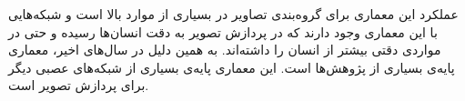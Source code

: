 عملکرد این معماری برای گروه‌بندی تصاویر در بسیاری از موارد بالا است و شبکه‌هایی با این معماری وجود دارند که در پردازش تصویر به دقت انسان‌ها رسیده و حتی در مواردی دقتی بیشتر از انسان را داشته‌اند. به همین دلیل در سال‌های اخیر، معماری پایه‌ی بسیاری از پژوهش‌ها است.
این معماری پایه‌ی بسیاری از شبکه‌های عصبی دیگر برای پردازش تصویر است.
